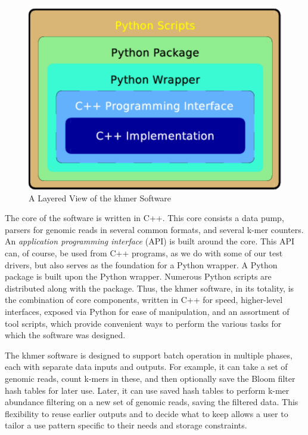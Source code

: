 \documentclass{article}
\begin{document}
\begin{figure}[ht!]
\centering
\includegraphics[scale=0.6]{layers.pdf}
\caption{A Layered View of the khmer Software}
\label{khmerLayers}
\end{figure}

The core of the software is written in C++. This core consists a data pump,
parsers for genomic reads in several common formats, and several k-mer
counters. An \textit{application programming interface} (API) is built around
the core. This API can, of course, be used from C++ programs, as we do with
some of our test drivers, but also serves as the foundation for a Python
wrapper. A Python package is built upon the Python wrapper. Numerous Python
scripts are distributed along with the package. Thus, the khmer software, in
its totality, is the combination of core components, written in C++ for speed,
higher-level interfaces, exposed via Python for ease of manipulation, and an
assortment of tool scripts, which provide convenient ways to perform the
various tasks for which the software was designed.

The khmer software is designed to support batch operation in multiple phases,
each with separate data inputs and outputs. For example, it can take a set of
genomic reads, count k-mers in these, and then optionally save the Bloom filter
hash tables for later use. Later, it can use saved hash tables to perform k-mer
abundance filtering on a new set of genomic reads, saving the filtered data.
This flexibility to reuse earlier outputs and to decide what to keep allows a
user to tailor a use pattern specific to their needs and storage constraints.
\end{document}
